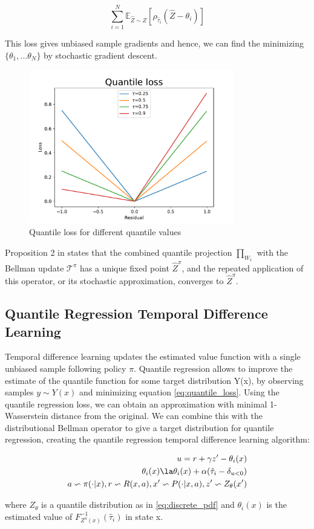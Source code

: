 \begin{equation}
    \sum_{i=1}^{N} \mathbb E_{\hat{Z} \sim Z} [ \rho_{\hat\tau_i}(\hat{Z}-\theta_i)]
\end{equation}

This loss gives unbiased sample gradients and hence, we can find the minimizing $\{\theta_1, ... \theta_N\}$
by stochastic gradient descent.



\begin{figure}[ht]
    \centering
    \includegraphics[width=0.8\textwidth]{images/quantile_loss.pdf}
    \caption{Quantile loss for different quantile values}
    \label{quantile_loss}
\end{figure}

Proposition 2 in \cite{Dabney2018a} states that the combined quantile projection 
$\prod_{W_1}$ with the Bellman update $\mathcal{T}^\pi$ has a unique fixed point $\hat{Z}^\pi$, and the repeated application
of this operator, or its stochastic approximation, converges to $\hat{Z}^\pi$.

\subsection{Quantile Regression Temporal Difference Learning}
Temporal difference learning updates the estimated value function with a single unbiased 
sample following policy $\pi$.
Quantile regression allows to improve the estimate of the quantile function for some target
distribution Y(x), by observing samples $y\sim Y(x)$ and minimizing equation \eqref{eq:quantile_loss}.
Using the quantile regression loss, we can obtain an approximation with minimal 1-Wasserstein distance
from the original.
We can combine this with the distributional Bellman operator to give a target distribution
for quantile regression, creating the quantile regression temporal difference learning algorithm:

\begin{eqnarray}
    u=r+\gamma z' - \theta_i(x)\\
    \theta_i(x) \la \theta_i(x) + \alpha (\hat\tau_i - \delta_{u<0})\\
    a \backsim \pi(\cdot |x) , r \backsim R(x,a), x'\backsim P(\cdot |x,a), z' \backsim Z_\theta(x')
\end{eqnarray}

where $Z_\theta$ is a quantile distribution as in \eqref{eq:discrete_pdf} and $\theta_i(x)$ 
is the estimated value of $F_{Z^\pi(x)}^{-1}(\hat\tau_i)$ in state x.
